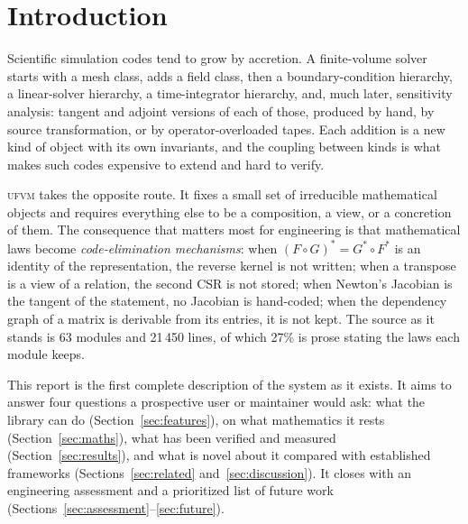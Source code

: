 \documentclass[11pt,a4paper]{article}
\newcommand{\ufvm}{\textsc{ufvm}}
\begin{document}
\section{Introduction}

Scientific simulation codes tend to grow by accretion. A finite-volume solver starts with a mesh class, adds a field class, then a boundary-condition hierarchy, a linear-solver hierarchy, a time-integrator hierarchy, and, much later, sensitivity analysis: tangent and adjoint versions of each of those, produced by hand, by source transformation, or by operator-overloaded tapes. Each addition is a new kind of object with its own invariants, and the coupling between kinds is what makes such codes expensive to extend and hard to verify.

\ufvm{} takes the opposite route. It fixes a small set of irreducible mathematical objects and requires everything else to be a composition, a view, or a concretion of them. The consequence that matters most for engineering is that mathematical laws become \emph{code-elimination mechanisms}: when $(F\circ G)^* = G^*\circ F^*$ is an identity of the representation, the reverse kernel is not written; when a transpose is a view of a relation, the second CSR is not stored; when Newton's Jacobian is the tangent of the statement, no Jacobian is hand-coded; when the dependency graph of a matrix is derivable from its entries, it is not kept. The source as it stands is 63 modules and 21\,450 lines, of which 27\% is prose stating the laws each module keeps.

This report is the first complete description of the system as it exists. It aims to answer four questions a prospective user or maintainer would ask: what the library can do (Section~\ref{sec:features}), on what mathematics it rests (Section~\ref{sec:maths}), what has been verified and measured (Section~\ref{sec:results}), and what is novel about it compared with established frameworks (Sections~\ref{sec:related} and~\ref{sec:discussion}). It closes with an engineering assessment and a prioritized list of future work (Sections~\ref{sec:assessment}--\ref{sec:future}).
\end{document}
